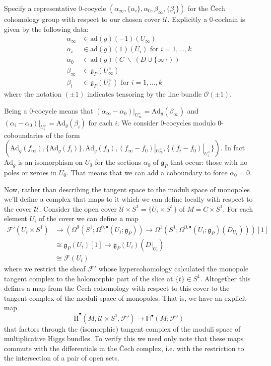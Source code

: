 \documentclass[11pt, oneside, reqno]{amsart}
\theoremstyle{definition} \newtheorem{definition}{Definition}[section]
\theoremstyle{definition} \newtheorem{remark}[definition]{Remark}
\theoremstyle{definition} \newtheorem{remarks}[definition]{Remarks}
\theoremstyle{definition} \newtheorem{question}[definition]{Question}
\theoremstyle{definition} \newtheorem*{note}{Note}
\theoremstyle{definition} \newtheorem{example}[definition]{Example}
\theoremstyle{definition} \newtheorem{examples}[definition]{Examples}
\renewcommand{\gg}{\mathfrak{g}}
\newcommand{\bb}[1]{\mathbb{#1}}
\newcommand{\mr}[1]{\mathrm{#1}}
\newcommand{\mc}[1]{\mathcal{#1}}
\newcommand{\bs}{\ \backslash \ }
\newcommand{\OO}{\mathcal{O}}
\newcommand{\iso}{\cong}
\newcommand{\ad}{\mr{ad}}
\begin{document}
Specify a representative 0-cocycle $(\alpha_\infty, \{\alpha_i\}, \alpha_0, \beta_\infty, \{\beta_i\})$ for the \v Cech cohomology group with respect to our chosen cover $\mc U$.  Explicitly a 0-cochain is given by the following data:
\begin{align*}
 \alpha_\infty &\in \ad(g)(-1)(U_\infty) \\
 \alpha_i &\in \ad(g)(1)(U_i) \text{ for } i = 1,\ldots,k \\
 \alpha_0 &\in \ad(g)(C \bs (D \cup \{\infty\})) \\
 \beta_\infty &\in \gg_P(U^\times_\infty) \\
 \beta_i &\in \gg_P(U^\times_i) \text{ for } i=1,\ldots,k
\end{align*}
where the notation $(\pm 1)$ indicates tensoring by the line bundle $\OO(\pm 1)$.

Being a 0-cocycle means that $(\alpha_\infty - \alpha_0)|_{U^\times_\infty} = \mr{Ad}_g(\beta_\infty)$ and $(\alpha_i - \alpha_0)|_{U^\times_i} = \mr{Ad}_g(\beta_i)$ for each $i$.  We consider 0-cocycles modulo 0-coboundaries of the form $(\mr{Ad}_g(f_\infty), \{\mr{Ad}_g(f_i)\}, \mr{Ad}_g(f_0), (f_\infty -  f_0)|_{U_\infty^\times}, \{(f_i - f_0)|_{U_i^\times}\})$.  In fact $\mr{Ad}_g$ is an isomorphism on $U_0$ for the sections $\alpha_0$ of $\gg_P$ that occur: those with no poles or zeroes in $U_0$.  That means that we can add a coboundary to force $\alpha_0=0$. 

Now, rather than describing the tangent space to the moduli space of monopoles we'll define a complex that maps to it which we can define locally with respect to the cover $\mc U$.  Consider the open cover $\mc U \times S^1 = \{U_i \times S^1\}$ of $M = C \times S^1$.  For each element $U_i$ of the cover we can define a map
\begin{align*}
\mc F'(U_i \times S^1) &\to (\Omega^0(S^1; \Omega^{0,\bullet}(U_i; \gg_P)) \to \Omega^1(S^1; \Omega^{0,\bullet}(U_i; \gg_P)(D_{U_i})))[1] \\ 
&\iso \gg_P(U_i)[1] \to \gg_P(U_i)(D|_{U_i}) \\
&\iso \mc F(U_i)
\end{align*}
where we restrict the sheaf $\mc F'$ whose hypercohomology calculated the monopole tangent complex to the holomorphic part of the slice at $\{t\} \in S^1$.  Altogether this defines a map from the \v Cech cohomology with respect to this cover to the tangent complex of the moduli space of monopoles.  That is, we have an explicit map
\[{\mr {\check H}}^\bullet(M, \mc U \times S^1, \mc F') \to \bb H^\bullet(M; \mc F')\]
that factors through the (isomorphic) tangent complex of the moduli space of multiplicative Higgs bundles.  To verify this we need only note that these maps commute with the differentials in the \v Cech complex, i.e. with the restriction to the intersection of a pair of open sets. 
\end{document}
